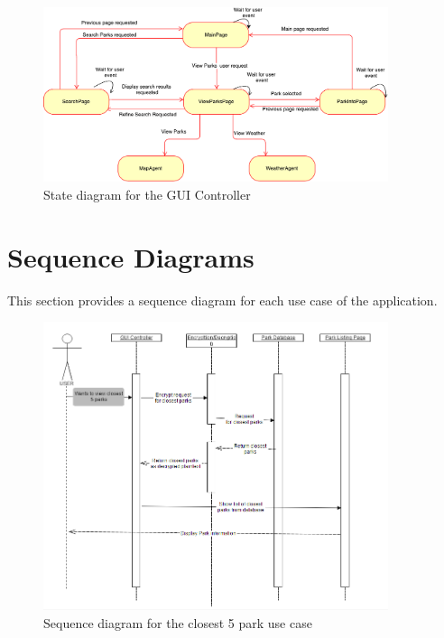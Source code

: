 \documentclass[titlepage,12pt]{article}
\begin{document}
\begin{figure}[H]
    \centerline{\includegraphics[width=0.90\textwidth]{state_diagrams/GUI_Controller}}
    \caption{State diagram for the GUI Controller}
    \label{fig:gui_controller}
\end{figure}

\newpage
\section{Sequence Diagrams}
\label{sec:sequence_diagrams}
This section provides a sequence diagram for each use case of the application.

\begin{figure}[H]
	\centerline{\includegraphics[width=0.90\textwidth]{sequence_diagrams/Closest5Parks}}
	\caption{Sequence diagram for the closest 5 park use case}
	\label{fig:SD1}
\end{figure}
\end{document}

